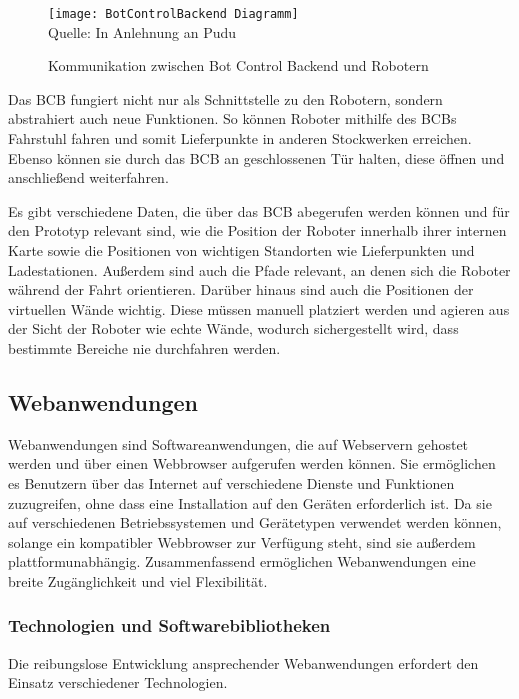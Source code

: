 \begin{figure}[H]
\caption{Kommunikation zwischen Bot Control Backend und Robotern}\label{fig:BotControlBackendCommunication}
\texttt{[image: BotControlBackend Diagramm]}
\\
Quelle: In Anlehnung an Pudu \cite[S.~4]{PuduSDK}
\end{figure}

Das \ac{BCB} fungiert nicht nur als Schnittstelle zu den Robotern, sondern abstrahiert auch neue Funktionen. So können Roboter mithilfe des \ac{BCB}s Fahrstuhl fahren und somit Lieferpunkte in anderen Stockwerken erreichen. Ebenso können sie durch das \ac{BCB} an geschlossenen Tür halten, diese öffnen und anschließend weiterfahren.

Es gibt verschiedene Daten, die über das \ac{BCB} abegerufen werden können und für den Prototyp relevant sind, wie die Position der Roboter innerhalb ihrer internen Karte sowie die Positionen von wichtigen Standorten wie Lieferpunkten und Ladestationen. Außerdem sind auch die Pfade relevant, an denen sich die Roboter während der Fahrt orientieren. Darüber hinaus sind auch die Positionen der virtuellen Wände wichtig. Diese müssen manuell platziert werden und agieren aus der Sicht der Roboter wie echte Wände, wodurch sichergestellt wird, dass bestimmte Bereiche nie durchfahren werden.

\subsection{Webanwendungen}
Webanwendungen sind Softwareanwendungen, die auf Webservern gehostet werden und über einen Webbrowser aufgerufen werden können. Sie ermöglichen es Benutzern über das Internet auf verschiedene Dienste und Funktionen zuzugreifen, ohne dass eine Installation auf den Geräten erforderlich ist. Da sie auf verschiedenen Betriebssystemen und Gerätetypen verwendet werden können, solange ein kompatibler Webbrowser zur Verfügung steht, sind sie außerdem plattformunabhängig. Zusammenfassend ermöglichen Webanwendungen eine breite Zugänglichkeit und viel Flexibilität.

\subsubsection{Technologien und Softwarebibliotheken}\label{sec:WebTechnologies}
Die reibungslose Entwicklung ansprechender Webanwendungen erfordert den Einsatz verschiedener Technologien.

